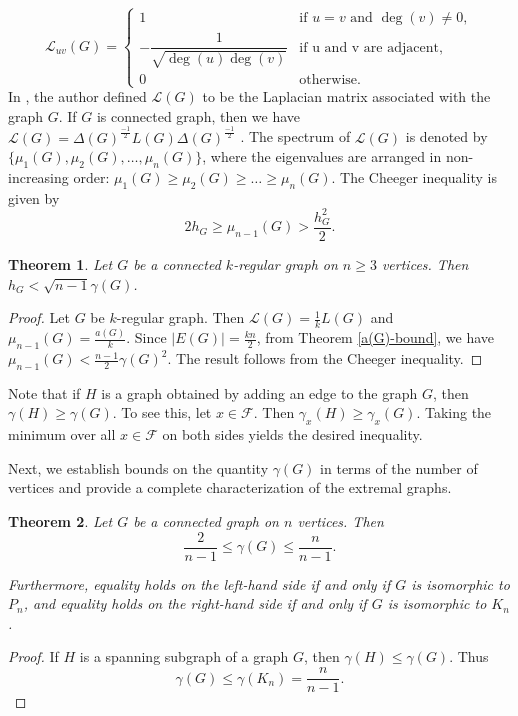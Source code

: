 \documentclass[12pt]{article}
\newtheorem{theorem}{Theorem}[section]
\begin{document}
{{			$$
			\mathcal{L}_{uv}(G) =
			\begin{cases}
				1 & \text{if } u = v \text{ and } \deg(v) \neq 0, \\
				-\dfrac{1}{\sqrt{\deg(u) \deg(v)}} & \text{if u and v are adjacent} , \\
				0 & \text{otherwise}.
			\end{cases}
			$$
			In \cite{chung-book-1997}, the author defined $\mathcal{L}(G)$ to be the Laplacian matrix associated with the graph $G$. If $G$ is connected graph, then we have $\mathcal{L}(G)=\Delta(G)^{\frac{-1}{2}}L(G)\Delta(G)^{\frac{-1}{2}}$ . The spectrum of $\mathcal{L}(G)$ is denoted by $\{ \mu_1 (G),\mu_2 (G),\dots,\mu_n (G)\}$, where the eigenvalues are arranged in non-increasing order: $\mu_1(G) \geq \mu_2(G)\geq \dots \geq \mu_n(G)$.
			The  Cheeger inequality is given by 
			$$
			2h_G \geq \mu_{n-1}(G) > \frac{h_G^2}{2}.
			$$
			\begin{theorem}
				Let $G$ be a connected $k$-regular graph on $n\geq 3$ vertices. Then $h_G < \sqrt{n-1} \gamma(G)$.
			\end{theorem}
			\begin{proof}
				Let $G$ be $k$-regular graph. Then $\mathcal{L}(G)=\frac{1}{k}L(G)$ and  $\mu_{n-1}(G)=\frac{a(G)}{k}$. Since $\vert E(G) \vert =\frac{kn}{2}$, from Theorem \ref{a(G)-bound}, we have $\mu_{n-1}(G) < \frac{n-1}{2} \gamma(G)^2$. The result follows from the Cheeger inequality.
			\end{proof}
			
			
			Note that if $H$ is a graph obtained by adding an edge to the graph $G$, then $\gamma (H) \geq \gamma (G)$. To see this, let $x \in \mathcal{F}$. Then $\gamma_x(H) \geq \gamma_x(G)$. Taking the minimum over all $x \in \mathcal{F}$ on both sides yields the desired inequality.
			
			Next,  we establish bounds on the quantity $\gamma(G)$ in terms of the number of vertices and provide a complete characterization of the extremal graphs.
			\begin{theorem}\label{global extremizer}
				Let $G$ be a connected graph on $n$ vertices. Then
				$$\frac{2}{n-1} \leq \gamma(G) \leq \frac{n}{n-1}.$$
				
				Furthermore,  equality holds on the left-hand side if and only if  $G$ is isomorphic to $P_n$, and equality holds on the right-hand side if and only if  $G$ is isomorphic to $K_n$.  
			\end{theorem}
			\begin{proof}
				If $H$ is a spanning subgraph of a graph $G$, then $\gamma (H) \leq \gamma (G)$. Thus $$\gamma(G) \leq \gamma(K_n) = \frac{n}{n-1}.$$
				

\end{proof}}}
\end{document}

